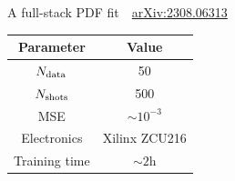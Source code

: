 \documentclass[8pt, xcolor={svgnames}, hyperref={linkcolor=black}]{beamer}
\begin{document}
\begin{frame}{A full-stack PDF fit \hfill \faBook\,\, \href{https://arxiv.org/abs/2308.06313}{arXiv:2308.06313}}
\begin{multicols}{2}
\begin{figure}
\end{figure}
\begin{table}
\flushright
\vspace{-0.5cm}
\begin{tabular}{cc}
\hline \hline 
\textbf{Parameter} & \textbf{Value} \\
\hline 
$N_{\rm data}$ & 50 \\
$N_{\rm shots}$ & 500 \\
MSE & $\sim 10^{-3}$ \\
Electronics & Xilinx ZCU216 \\
Training time & $\sim 2$h \\
\hline \hline
\end{tabular}
\end{table}
\vspace{0.5cm}
\end{multicols}
\end{frame}
\end{document}
